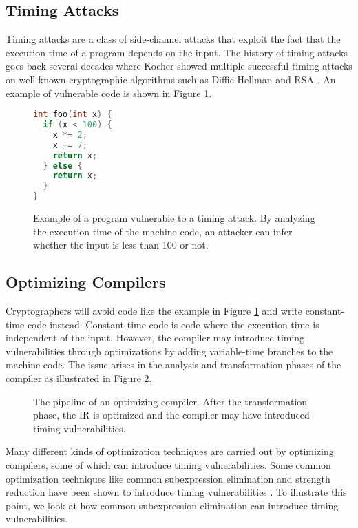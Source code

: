 \subsection{Timing Attacks}
Timing attacks are a class of side-channel attacks that exploit the fact that the execution time of a program depends on the input.
The history of timing attacks goes back several decades where Kocher showed multiple successful timing attacks on well-known cryptographic algorithms such as Diffie-Hellman and RSA \citep{1996-timing-attacks}.
An example of vulnerable code is shown in Figure \ref{fig:timing-attack-example}.
\begin{figure}[H]
  \begin{lstlisting}[style=defstyle,language=C, xleftmargin=6.8cm, xrightmargin=6.8cm]
int foo(int x) {
  if (x < 100) {
    x *= 2;
    x += 7;
    return x;
  } else {
    return x;
  }
} \end{lstlisting} 
  \caption{Example of a program vulnerable to a timing attack. By analyzing the execution time of the machine code, an attacker can infer whether the input is less than 100 or not.}
  \label{fig:timing-attack-example}
\end{figure}

\subsection{Optimizing Compilers}
Cryptographers will avoid code like the example in Figure \ref{fig:timing-attack-example} and write constant-time code instead.
Constant-time code is code where the execution time is independent of the input.
However, the compiler may introduce timing vulnerabilities through optimizations by adding variable-time branches to the machine code.
The issue arises in the analysis and transformation phases of the compiler as illustrated in Figure \ref{fig:optimizing-compiler-pipeline}.

\begin{figure}[H]
  \centering
  
  \caption{The pipeline of an optimizing compiler. After the transformation phase, the IR is optimized and the compiler may have introduced timing vulnerabilities.}
  \label{fig:optimizing-compiler-pipeline}
\end{figure}

Many different kinds of optimization techniques are carried out by optimizing compilers, some of which can introduce timing vulnerabilities.
Some common optimization techniques like common subexpression elimination and strength reduction have been shown to introduce timing vulnerabilities \citep{optimizations-linked-to-timing-attacks}.
To illustrate this point, we look at how common subexpression elimination can introduce timing vulnerabilities.

